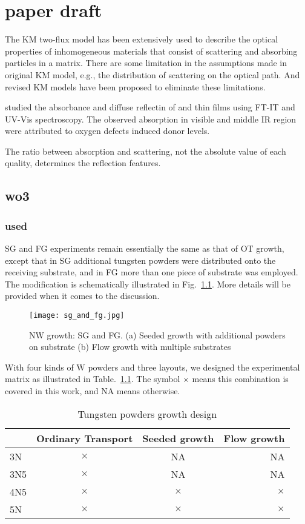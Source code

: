 \chapter{paper draft}

The KM two-flux model has been extensively used to describe the optical properties of inhomogeneous materials that consist of scattering and absorbing particles in a matrix.\cite{Vargas1997} There are some limitation in the assumptions made in original KM model, e.g., the distribution of scattering on the optical path. And revised KM models have been proposed to eliminate these limitations.\cite{Yang2004}  

\citeauthor{Morandi2005} studied the absorbance and diffuse reflectin of  and  thin films using FT-IT and UV-Vis spectroscopy. The observed absorption in visible and middle IR region were attributed to oxygen defects induced donor levels.\cite{Morandi2005}

The ratio between absorption and scattering, not the absolute value of each quality, determines the reflection features.


\section{wo3}

\subsection{used}

SG and FG experiments remain essentially the same as that of OT growth, except that in SG additional tungsten powders were distributed onto the receiving substrate, and in FG more than one piece of substrate was employed. The modification is schematically illustrated in Fig.~\ref{fig:wogrowsf}. More details will be provided when it comes to the discussion.
\begin{figure}[htb]
\centering
\texttt{[image: sg\_and\_fg.jpg]}
\caption[ NW growth: SG and FG]{ NW growth: SG and FG. (a) Seeded growth with additional powders on substrate (b) Flow growth with multiple substrates}
\label{fig:wogrowsf}
\end{figure}

With four kinds of W powders and three layouts, we designed the experimental matrix as illustrated in Table.~\ref{tab:matrix}. The symbol $\times$ means this combination is covered in this work, and NA means otherwise.
\begin{table}[htb]
\centering
\caption{Tungsten powders growth design}\label{tab:matrix}
\begin{tabular}{lccr}
\toprule
 & Ordinary Transport & Seeded growth & Flow growth \\
\midrule
3N   &  $\times$ & NA &  NA   \\
3N5  &  $\times$ & NA &  NA   \\
4N5  &  $\times$ & $\times$ & $\times$ \\
5N   &  $\times$ & $\times$ &  $\times$ \\
\bottomrule
\end{tabular}
\end{table}

